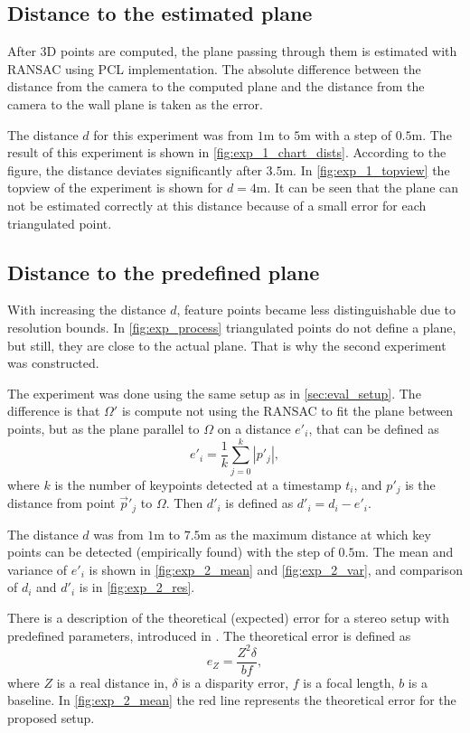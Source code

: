 \subsection{Distance to the estimated plane}
\label{sec:exp1}
After 3D points are computed, the plane passing through them is estimated with RANSAC using PCL implementation. 
The absolute difference between the distance from the camera to the computed plane and the distance from the camera to the wall plane is taken as the error.

The distance $d$ for this experiment was from $1$m to $5$m with a step of $0.5$m.
The result of this experiment is shown in \autoref{fig:exp_1_chart_dists}.
According to the figure, the distance deviates significantly after $3.5$m.
In \autoref{fig:exp_1_topview} the topview of the experiment is shown for $d=4$m.
It can be seen that the plane can not be estimated correctly at this distance because of a small error for each triangulated point.

\subsection{Distance to the predefined plane}
\label{sec:exp2}
With increasing the distance $d$, feature points became less distinguishable due to resolution bounds.
In \autoref{fig:exp_process} triangulated points do not define a plane, but still, they are close to the actual plane.
That is why the second experiment was constructed.

The experiment was done using the same setup as in \autoref{sec:eval_setup}. 
The difference is that $\Omega'$ is compute not using the RANSAC to fit the plane between points, but as the plane parallel to $\Omega$ on a distance $e'_i$, that can be defined as
\begin{equation}    
    e'_i = \frac{1}{k} \sum_{j=0}^{k}{|p'_j|},
\end{equation}
where $k$ is the number of keypoints detected at a timestamp $t_i$, and $p'_j$ is the distance from point $\vec{p}'_j$ to $\Omega$.
Then $d'_i$ is defined as $d'_i = d_i - e'_i$.

The distance $d$ was from $1$m to $7.5$m as the maximum distance at which key points can be detected (empirically found) with the step of $0.5$m.
The mean and variance of $e'_i$ is shown in \autoref{fig:exp_2_mean} and \autoref{fig:exp_2_var}, and comparison of $d_i$ and $d'_i$ is in \autoref{fig:exp_2_res}. 

There is a description of the theoretical (expected) error for a stereo setup with predefined parameters, introduced in \cite{cv_theoretical_error}.
The theoretical error is defined as
\begin{equation}
    e_Z = \frac{Z^2 \delta}{bf},
\end{equation}
where $Z$ is a real distance in, $\delta$ is a disparity error, $f$ is a focal length, $b$ is a baseline.
In \autoref{fig:exp_2_mean} the red line represents the theoretical error for the proposed setup.

